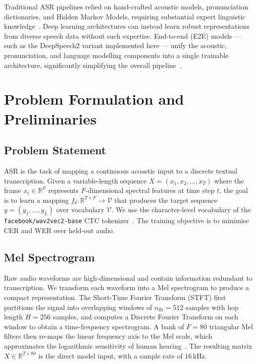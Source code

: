 \documentclass{article}
\begin{document}
Traditional ASR pipelines relied on hand-crafted acoustic models, pronunciation dictionaries, and Hidden Markov Models, requiring substantial expert linguistic knowledge~\cite{juang2005automatic}. Deep learning architectures can instead learn robust representations from diverse speech data without such expertise. End-to-end (E2E) models — such as the DeepSpeech2 variant implemented here — unify the acoustic, pronunciation, and language modelling components into a single trainable architecture, significantly simplifying the overall pipeline~\cite{amodei2016deep}.

\section{Problem Formulation and Preliminaries}
\label{sec:prelim}

\subsection{Problem Statement}

ASR is the task of mapping a continuous acoustic input to a discrete textual transcription. Given a variable-length sequence $X = (x_1, x_2, \ldots, x_T)$ where the frame $x_t \in \mathbb{R}^F$ represents $F$-dimensional spectral features at time step $t$, the goal is to learn a mapping $f_\theta: \mathbb{R}^{T \times F} \to \mathcal{V}$ that produces the target sequence $y = (y_1, \ldots, y_L)$ over vocabulary $\mathcal{V}$. We use the character-level vocabulary of the \texttt{facebook/wav2vec2-base} CTC tokenizer~\cite{wolf-etal-2020-transformers}. The training objective is to minimise CER and WER over held-out audio.

\subsection{Mel Spectrogram}

Raw audio waveforms are high-dimensional and contain information redundant to transcription. We transform each waveform into a Mel spectrogram to produce a compact representation. The Short-Time Fourier Transform (STFT) first partitions the signal into overlapping windows of $n_\text{fft} = 512$ samples with hop length $H = 256$ samples, and computes a Discrete Fourier Transform on each window to obtain a time-frequency spectrogram. A bank of $F = 80$ triangular Mel filters then re-maps the linear frequency axis to the Mel scale, which approximates the logarithmic sensitivity of human hearing~\cite{mel_scale_rationale}. The resulting matrix $X \in \mathbb{R}^{T \times 80}$ is the direct model input, with a sample rate of 16\,kHz.
\end{document}
